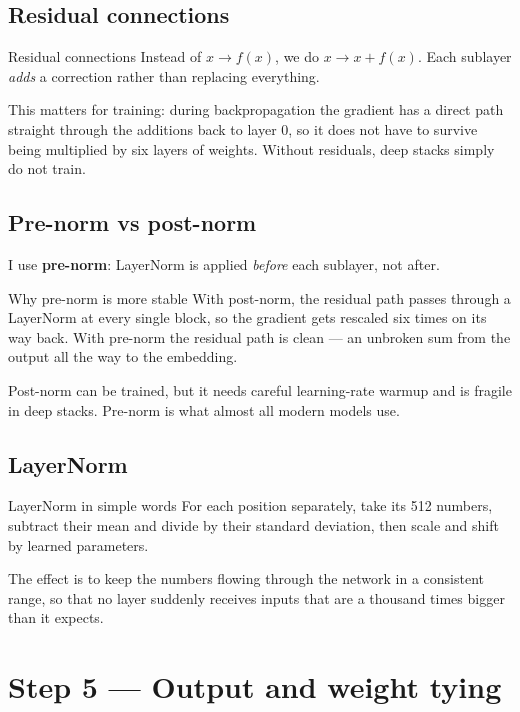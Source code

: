 \documentclass[11pt]{report}
\begin{document}
\subsection{Residual connections}

\begin{concept}{Residual connections}
Instead of $x \rightarrow f(x)$, we do $x \rightarrow x + f(x)$. Each sublayer
\emph{adds} a correction rather than replacing everything.

This matters for training: during backpropagation the gradient has a direct path
straight through the additions back to layer 0, so it does not have to survive
being multiplied by six layers of weights. Without residuals, deep stacks simply
do not train.
\end{concept}

\subsection{Pre-norm vs post-norm}

I use \textbf{pre-norm}: LayerNorm is applied \emph{before} each sublayer, not
after.

\begin{concept}{Why pre-norm is more stable}
With post-norm, the residual path passes through a LayerNorm at every single
block, so the gradient gets rescaled six times on its way back. With pre-norm
the residual path is clean --- an unbroken sum from the output all the way to
the embedding.

Post-norm can be trained, but it needs careful learning-rate warmup and is
fragile in deep stacks. Pre-norm is what almost all modern models use.
\end{concept}

\subsection{LayerNorm}

\begin{concept}{LayerNorm in simple words}
For each position separately, take its 512 numbers, subtract their mean and
divide by their standard deviation, then scale and shift by learned parameters.

The effect is to keep the numbers flowing through the network in a consistent
range, so that no layer suddenly receives inputs that are a thousand times
bigger than it expects.
\end{concept}

\section{Step 5 --- Output and weight tying}
\end{document}
